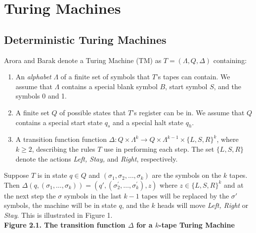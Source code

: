 \documentclass[11pt]{article}
\begin{document}
\section{Turing Machines} 

\subsection{Deterministic Turing Machines} 

 Arora and Barak denote a Turing Machine (TM) as $ T = (\Lambda, Q, \Delta) $ containing:
\begin{enumerate}
\item An \textit{alphabet} $ \Lambda $ of a finite set of symbols that $ T $'s tapes can contain. We assume that $ \Lambda $ contains a special blank symbol $ B $, start symbol $ S $, and the symbols 0 and 1. 
\item A finite set $ Q $ of possible states that $ T $'s register can be in. We assume that $ Q $ contains a special start state $ q_{s} $ and a special halt state $ q_{h} $. 
\item A transition function function $ \Delta : Q \times \Lambda^{k} \rightarrow Q \times \Lambda^{k - 1} \times \{L, S, R\}^{k} $, where $ k \geq 2$, describing the rules $ T $ use in performing each step. The set $\{L ,S, R\}$ denote the actions \textit{Left, Stay,} and \textit{Right}, respectively. 
\end{enumerate}

Suppose $ T $ is in state $ q \in Q $ and $ (\sigma_1, \sigma_2, \dots, \sigma_k) $ are the symbols on the $ k $ tapes. Then $ \Delta(q, (\sigma_1, \dots, \sigma_k)) = (q', (\sigma_{2}^{'}, \dots, \sigma_{k}^{'}), z) $ where $ z \in \{L, S, R\}^k $ and at the next step the $ \sigma $ symbols in the last $ k - 1 $ tapes will be replaced by the $ \sigma' $ symbols, the machine will be in state $ q $, and the $ k $ heads will move \textit{Left, Right} or \textit{Stay}. This is illustrated in Figure 1. \\

\textbf{Figure 2.1. The transition function $ \Delta $ for a $ k $-tape Turing Machine}
\end{document}

